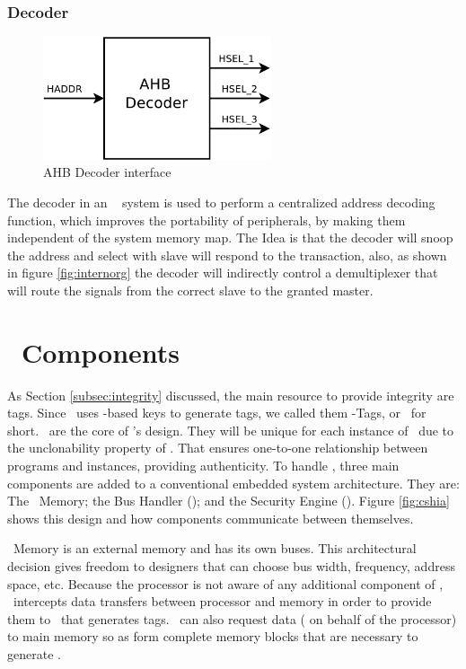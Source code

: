 \subsubsection{Decoder}

\begin{figure}[ht]
    \centering
    \includegraphics[width=0.6\textwidth]{figures/pdf/ahb_decoder_new.pdf}
    \caption{AHB Decoder interface}
    \label{fig:decoder int}
\end{figure}
 The decoder in an \amba~ system is used to perform a centralized address decoding function, which improves the portability of peripherals, by making them independent of the system memory map. The Idea is that the  decoder will snoop the address and select with slave will respond to the transaction, also, as shown in figure \ref{fig:internorg} the decoder will indirectly control a demultiplexer  that will route the signals from the correct slave to the granted master.

 

\section{\cshia~Components}
\label{sec:Components-of-the-Architecture}
As Section \ref{subsec:integrity} discussed, the main resource to provide integrity are tags. Since \cshia~uses \puf-based keys to generate tags, we called them \puf-Tags, or \ptags~for short. \ptags~are the core of \cshia's design. They will be unique for each instance of \cshia~due to the unclonability property of \pufs. That ensures one-to-one relationship between programs and instances, providing authenticity. To handle \ptags, three main components are added to a conventional embedded system architecture. They are: The \ptag~Memory; the Bus Handler (\handler); and the Security Engine (\seceng). Figure \ref{fig:cshia} shows this design and how components communicate between themselves. 

\ptag~Memory is an external memory and has its own buses. This architectural decision gives freedom to designers that can choose bus width, frequency, address space, etc. Because the processor is not aware of any additional component of \cshia, \handler~intercepts data transfers between processor and memory in order to provide them to \seceng~that generates tags. \handler~can also request data ( on behalf of the processor) to main memory so as  form complete memory blocks that are necessary to generate \ptags.

